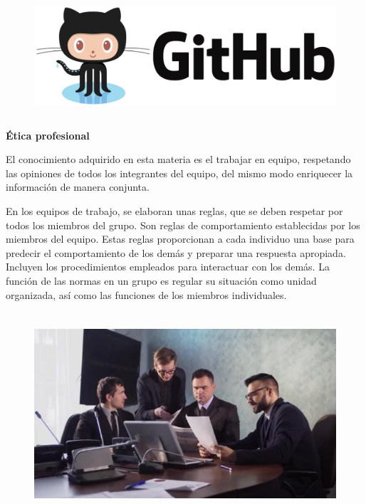 \documentclass[12pt]{article}
\begin{document}
\begin{figure}[H]
	\begin{Center}
		\includegraphics[width=5.23in,height=1.74in]{./media/image6.png}
	\end{Center}
\end{figure}




\par


\vspace{\baselineskip}

\vspace{\baselineskip}
\textbf{Ética profesional}\par

El conocimiento adquirido en esta materia es el trabajar en equipo, respetando las opiniones de todos los integrantes del equipo, del mismo modo enriquecer la información de manera conjunta. \par

En los equipos de trabajo, se elaboran unas reglas, que se deben respetar por todos los miembros del grupo. Son reglas de comportamiento establecidas por los miembros del equipo. Estas reglas proporcionan a cada individuo una base para predecir el comportamiento de los demás y preparar una respuesta apropiada. Incluyen los procedimientos empleados para interactuar con los demás. La función de las normas en un grupo es regular su situación como unidad organizada, así como las funciones de los miembros individuales.\par





\begin{figure}[H]
	\begin{Center}
		\includegraphics[width=5.3in,height=2.98in]{./media/image7.jpeg}
	\end{Center}
\end{figure}
\end{document}
